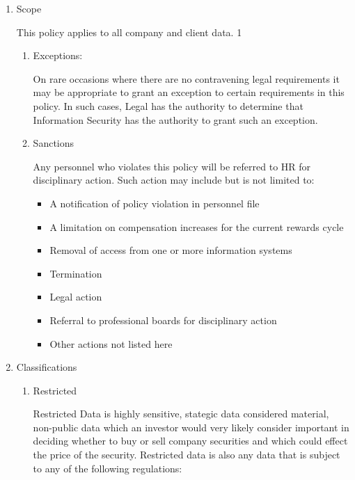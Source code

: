 \documentclass[stu]{apa7}
\begin{document}
\begin{enumerate}
\item Scope
\label{sec:org691f707}

This policy applies to all company and client data. 1

\begin{enumerate}
\item Exceptions:
\label{sec:orgf3cb53c}

On rare occasions where there are no contravening legal requirements it may be appropriate to grant an exception to certain requirements in this policy. In such cases, Legal has the authority to determine that Information Security has the authority to grant such an exception.

\item Sanctions
\label{sec:orgce4ea6e}

Any personnel who violates this policy will be referred to HR for disciplinary action. Such action may include but is not limited to:

\begin{itemize}
\item A notification of policy violation in personnel file
\item A limitation on compensation increases for the current rewards cycle
\item Removal of access from one or more information systems
\item Termination
\item Legal action
\item Referral to professional boards for disciplinary action
\item Other actions not listed here
\end{itemize}
\end{enumerate}

\item Classifications
\label{sec:org1e124ac}

\begin{enumerate}
\item Restricted
\label{sec:org19b4971}

Restricted Data is highly sensitive, stategic data considered material, non-public data which an investor would very likely consider important in deciding whether to buy or sell company securities and which could effect the price of the security. Restricted data is also any data that is subject to any of the following regulations:


\end{enumerate}
\end{enumerate}
\end{document}
